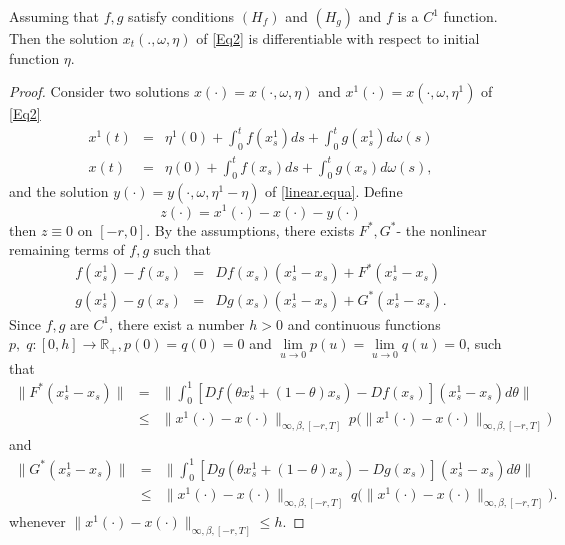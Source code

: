 \documentclass[graybox]{svmult}
\newcommand{\R}{\ensuremath{\mathbb{R}}}
\begin{document}

\begin{theorem}\label{thm4}
	Assuming that $f,g$ satisfy conditions $(H_f)$ and $(H_g)$ and $f$ is a $C^1$ function. Then the solution $x_t(.,\omega,\eta)$ of \eqref{Eq2} is differentiable with respect to initial function $\eta$.
\end{theorem}

\begin{proof}
	Consider two solutions $x(\cdot)=x(\cdot,\omega,\eta)$ and $x^1(\cdot)=x(\cdot,\omega,\eta^1)$ of  \eqref{Eq2}
	\begin{eqnarray*}
		x^1(t) &=& \eta^1(0)+\int_0^t f(x_s^1)ds +\int_0^tg(x^1_s)d\omega(s)\\
		x(t) &=& \eta(0)+\int_0^t f(x_s)ds +\int_0^tg(x_s)d\omega(s),
	\end{eqnarray*}
	and the solution $y(\cdot)=y(\cdot,\omega,\eta^1-\eta)$ of \eqref{linear.equa}. Define 
	\[
	z(\cdot)=x^1(\cdot)-x(\cdot)- y(\cdot)
	\]
	then $z\equiv 0$ on $[-r,0]$. By the assumptions, there exists $F^*,G^*$- the nonlinear remaining terms of $f,g$ such that 
	\begin{eqnarray*}
		f(x_s^1)-f(x_s) &=& Df(x_s)(x_s^1-x_s) + F^*(x^1_s-x_s) \\
		g(x_s^1)-g(x_s) &=& Dg(x_s)(x_s^1-x_s) + G^*(x^1_s-x_s).
	\end{eqnarray*}
	Since $f, g$ are $C^1$, there exist a number $h>0$ and continuous functions $p,\; q: [0,h] \to \R_+, p(0)=q(0)=0$ and $\lim \limits_{u \to 0} p(u) =\lim \limits_{u \to 0} q(u) =0$, such that 
	\begin{eqnarray*}
		\|F^*(x^1_s-x_s)\| &=& \Big\|\int_0^1 [Df(\theta x^1_s +(1-\theta) x_s) - Df(x_s)](x^1_s-x_s)d\theta \Big\| \\
		&\leq& \|x^1(\cdot)-x(\cdot)\|_{\infty,\beta,[-r,T]}\  p\big(\|x^1(\cdot)-x(\cdot)\|_{\infty,\beta,[-r,T]}\big)
	\end{eqnarray*}
	and
	\begin{eqnarray*}
		\|G^*(x^1_s-x_s)\| &=& \Big\|\int_0^1 [Dg(\theta x^1_s +(1-\theta) x_s) - Dg(x_s)](x^1_s-x_s)d\theta \Big\| \\
		&\leq& \|x^1(\cdot)-x(\cdot)\|_{\infty,\beta,[-r,T]} \ q\big(\|x^1(\cdot)-x(\cdot)\|_{\infty,\beta,[-r,T]}\big).
	\end{eqnarray*}
	whenever $\|x^1(\cdot)-x(\cdot)\|_{\infty,\beta,[-r,T]} \leq h$. %

\end{proof}
\end{document}
